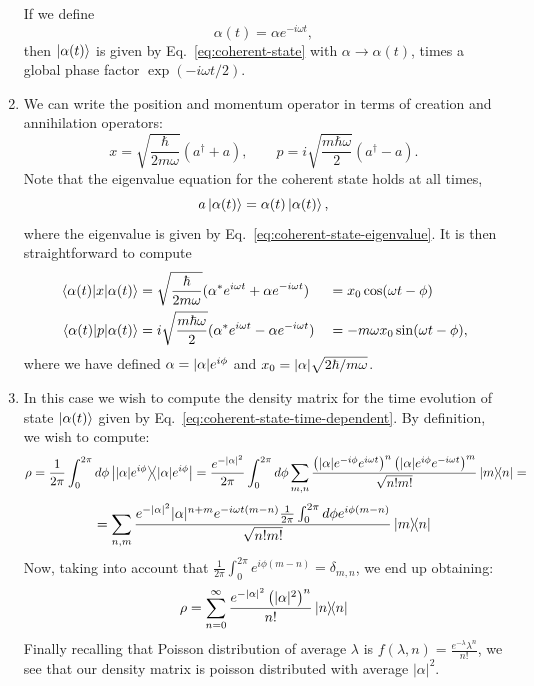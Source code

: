 \documentclass[12pt]{article}
\begin{document}
\begin{appendices}
\begin{enumerate}[label=\alph*)]
If we define
\begin{equation}
    \alpha(t) = \alpha e^{-i\omega t},
    \label{eq:coherent-state-eigenvalue}
\end{equation}
then $\ket{\alpha(t)}$ is given by Eq.~\eqref{eq:coherent-state} with $\alpha \rightarrow \alpha(t)$, times a global phase factor $\exp(-i\omega t/2)$.

\item We can write the position and momentum operator in terms of creation and annihilation operators:
\[x = \sqrt{\frac{\hbar}{2 m \omega}} (a^\dag + a),
\qquad p = i\sqrt{\frac{m\hbar \omega}{2}} (a^\dag - a).\]
Note that the eigenvalue equation for the coherent state holds at all times,
\[a\ket{\alpha(t)} = \alpha(t)\ket{\alpha(t)},\]
where the eigenvalue is given by Eq.~\eqref{eq:coherent-state-eigenvalue}. It is then straightforward to compute
\begin{alignat}{2}
    \ev{x}{\alpha(t)}
    &= \sqrt{\frac{\hbar}{2 m \omega}}
    (\alpha^* e^{i\omega t} + \alpha e^{-i\omega t})
    &&= x_0 \cos(\omega t - \phi) \\
    \ev{p}{\alpha(t)}
    &= i\sqrt{\frac{m\hbar \omega}{2}}
    (\alpha^* e^{i\omega t} - \alpha e^{-i\omega t})
    &&= -m \omega x_0 \sin(\omega t - \phi),
\end{alignat}
where we have defined $\alpha = \abs{\alpha}e^{i\phi}$ and $x_0 = \abs{\alpha}\sqrt{2\hbar/m\omega}$.


\item In this case we wish to compute the density matrix for the time evolution of state $\ket{\alpha(t)}$ given by Eq.~\eqref{eq:coherent-state-time-dependent}.
By definition, we wish to compute:
\begin{equation}
    \rho  = \frac{1}{2\pi}\int_0^{2\pi}d\phi\ketbra{|\alpha|e^{i\phi}}{|\alpha|e^{i\phi}} = \frac{e^{-|\alpha|^2}}{2\pi}\int_0^{2\pi}d\phi \sum_{m,n}\frac{\left( |\alpha|e^{-i\phi} e^{i \omega t}\right)^n \left( |\alpha|e^{i\phi} e^{-i \omega t}\right)^m}{\sqrt{n!m!}}\ketbra{m}{n}=
\end{equation}
\begin{equation}
     = \sum_{n,m}\frac{e^{-|\alpha|^2} |\alpha|^{n+m}e^{-i \omega t(m-n)} \frac{1}{2\pi}\int_0^{2\pi}d\phi e^{i\phi(m-n)}}{\sqrt{n!m!}}\ketbra{m}{n}
\end{equation}
Now, taking into account that $\frac{1}{2\pi}\int_0^{2\pi}e^{i\phi(m-n)} = \delta_{m,n}$, we end up obtaining:
\begin{equation}
     \rho = \sum_{n = 0}^\infty \frac{e^{-|\alpha|^2} \left(|\alpha|^2\right)^n}{n!}\ketbra{n}{n}
\end{equation}
Finally recalling that Poisson distribution of average $\lambda$ is $f(\lambda, n) = \frac{e^{-\lambda}\lambda^n}{n!}$, we see that our density matrix is poisson distributed with average $|\alpha|^2$.



\end{enumerate}
\end{appendices}
\end{document}
